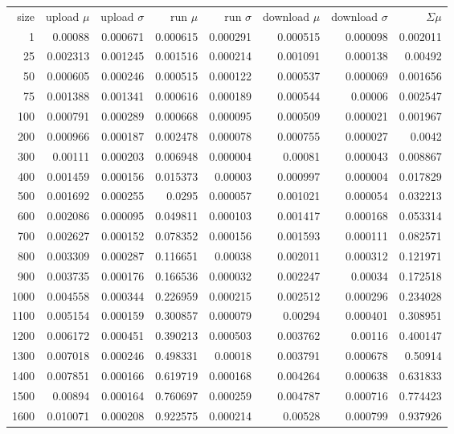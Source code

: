 \begin{longtable}{r r r r r r r r}
size & upload $\mu$  & upload $\sigma$ & run $\mu$ & run $\sigma$ & download $\mu$ & download $\sigma$ & $\Sigma \mu$ \\
1 & 0.00088 & 0.000671 & 0.000615 & 0.000291 & 0.000515 & 0.000098 & 0.002011 \\
25 & 0.002313 & 0.001245 & 0.001516 & 0.000214 & 0.001091 & 0.000138 & 0.00492 \\
50 & 0.000605 & 0.000246 & 0.000515 & 0.000122 & 0.000537 & 0.000069 & 0.001656 \\
75 & 0.001388 & 0.001341 & 0.000616 & 0.000189 & 0.000544 & 0.00006 & 0.002547 \\
100 & 0.000791 & 0.000289 & 0.000668 & 0.000095 & 0.000509 & 0.000021 & 0.001967 \\
200 & 0.000966 & 0.000187 & 0.002478 & 0.000078 & 0.000755 & 0.000027 & 0.0042 \\
300 & 0.00111 & 0.000203 & 0.006948 & 0.000004 & 0.00081 & 0.000043 & 0.008867 \\
400 & 0.001459 & 0.000156 & 0.015373 & 0.00003 & 0.000997 & 0.000004 & 0.017829 \\
500 & 0.001692 & 0.000255 & 0.0295 & 0.000057 & 0.001021 & 0.000054 & 0.032213 \\
600 & 0.002086 & 0.000095 & 0.049811 & 0.000103 & 0.001417 & 0.000168 & 0.053314 \\
700 & 0.002627 & 0.000152 & 0.078352 & 0.000156 & 0.001593 & 0.000111 & 0.082571 \\
800 & 0.003309 & 0.000287 & 0.116651 & 0.00038 & 0.002011 & 0.000312 & 0.121971 \\
900 & 0.003735 & 0.000176 & 0.166536 & 0.000032 & 0.002247 & 0.00034 & 0.172518 \\
1000 & 0.004558 & 0.000344 & 0.226959 & 0.000215 & 0.002512 & 0.000296 & 0.234028 \\
1100 & 0.005154 & 0.000159 & 0.300857 & 0.000079 & 0.00294 & 0.000401 & 0.308951 \\
1200 & 0.006172 & 0.000451 & 0.390213 & 0.000503 & 0.003762 & 0.00116 & 0.400147 \\
1300 & 0.007018 & 0.000246 & 0.498331 & 0.00018 & 0.003791 & 0.000678 & 0.50914 \\
1400 & 0.007851 & 0.000166 & 0.619719 & 0.000168 & 0.004264 & 0.000638 & 0.631833 \\
1500 & 0.00894 & 0.000164 & 0.760697 & 0.000259 & 0.004787 & 0.000716 & 0.774423 \\
1600 & 0.010071 & 0.000208 & 0.922575 & 0.000214 & 0.00528 & 0.000799 & 0.937926 \\

\end{longtable}
